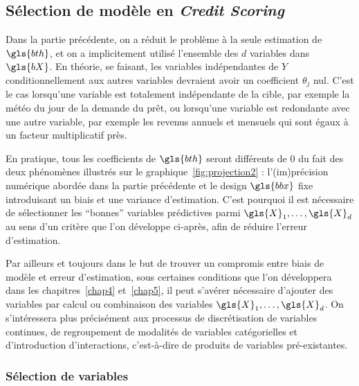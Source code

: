\subsection{Sélection de modèle en \textit{Credit Scoring}}

Dans la partie précédente, on a réduit le problème à la seule estimation de $\gls{bth}$, et on a implicitement utilisé l'ensemble des $d$ variables dans $\gls{bX}$. En théorie, se faisant, les variables indépendantes de $Y$ conditionnellement aux autres variables devraient avoir un coefficient $\theta_j$ nul. C'est le cas lorsqu'une variable est totalement indépendante de la cible, par exemple la météo du jour de la demande du prêt, ou lorsqu'une variable est redondante avec une autre variable, par exemple les revenus annuels et mensuels qui sont égaux à un facteur multiplicatif près.

En pratique, tous les coefficients de $\gls{bth}$ seront différents de $0$ du fait des deux phénomènes illustrés sur le graphique~\ref{fig:projection2} : l'(im)précision numérique abordée dans la partie précédente et le design $\gls{bbx}$ fixe introduisant un biais et une variance d'estimation. C'est pourquoi il est nécessaire de sélectionner les ``bonnes'' variables prédictives parmi $\gls{X}_1,\dots,\gls{X}_d$ au sens d'un critère que l'on développe ci-après, afin de réduire l'erreur d'estimation.

Par ailleurs et toujours dans le but de trouver un compromis entre biais de modèle et erreur d'estimation, sous certaines conditions que l'on développera dans les chapitres~\ref{chap4} et~\ref{chap5}, il peut s'avérer nécessaire d'ajouter des variables par calcul ou combinaison des variables $\gls{X}_1,\dots,\gls{X}_d$. On s'intéressera plus précisément aux processus de discrétisation de variables continues, de regroupement de modalités de variables catégorielles et d'introduction d'interactions, c'est-à-dire de produits de variables pré-existantes. 

\subsubsection{Sélection de variables} \label{subsubsec:selection}

